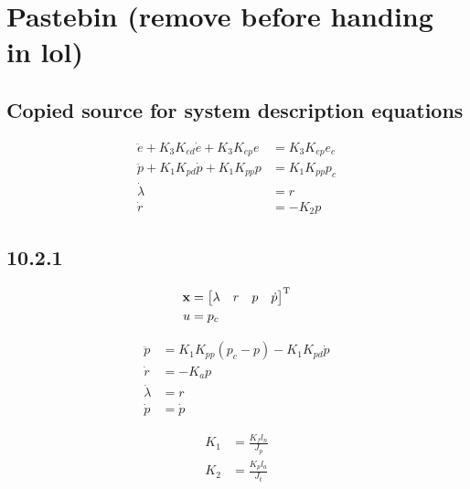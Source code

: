 \section{Pastebin (remove before handing in lol)}

\subsection{Copied source for system description equations}
\begin{subequations}
\label{eq:model_al}
\begin{align}
	\ddot{e} + K_{3} K_{ed} \dot{e} + K_{3} K_{ep} e &= K_{3} K_{ep} e_{c} \label{eq:model_se_al_elev} \\
	\ddot{p} + K_{1} K_{pd} \dot{p} + K_{1} K_{pp} p &= K_{1} K_{pp} p_{c} \label{eq:model_se_al_pitch} \\
	\dot{\lambda} &= r \label{eq:model_se_al_lambda} \\
	\dot{r} &= -K_{2} p \label{eq:model_se_al_r} 
\end{align}
\end{subequations}

\subsection{10.2.1}

\begin{subequations}
\begin{align}
	\mathbf{x} 	&= \begin{bmatrix}\lambda & r & p & \dot{p} \end{bmatrix}^{\text{T}} \\
	u 		&= p_{c}
\end{align}
\end{subequations}

\begin{subequations}
\begin{align}
	\ddot{p} 		&= K_{1} K_{pp} (p_{c} - p) - K_{1} K_{pd} \dot{p} \\
	\dot{r} 		&= - K_{a} p \\
	\dot{\lambda} 	&= r \\
	\dot{p} 		&= \dot{p}
\end{align}
\end{subequations}

\begin{subequations}
\begin{align}
	K_{1} &= \frac{K_{f} l_{n}}{J_{p}} \\
	K_{2} &= \frac{K_{p} l_{a}}{J_{t}}
\end{align}
\end{subequations}

